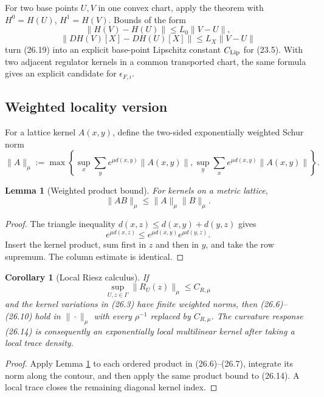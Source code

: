 \documentclass[11pt]{article}
\newtheorem{lemma}[theorem]{Lemma}
\newtheorem{corollary}[theorem]{Corollary}
\begin{document}
For two base points \(U,V\) in one convex chart, apply the theorem with
\(H^0=H(U)\), \(H^1=H(V)\).  Bounds of the form
\[
 \|H(V)-H(U)\|\leq L_0\|V-U\|,
 \tag{26.24}
\]
\[
 \|D H(V)[X]-D H(U)[X]\|
 \leq L_X\|V-U\|
 \tag{26.25}
\]
turn (26.19) into an explicit base-point Lipschitz constant
\(C_{\rm Lip}\) for (23.5).  With two adjacent regulator kernels in a
common transported chart, the same formula gives an explicit candidate
for \(\epsilon_{F,i}\).

\subsection{Weighted locality version}

For a lattice kernel \(A(x,y)\), define the two-sided exponentially
weighted Schur norm
\[
 \|A\|_\mu
 :=
 \max\left\{
 \sup_x\sum_y e^{\mu d(x,y)}\|A(x,y)\|,
 \sup_y\sum_x e^{\mu d(x,y)}\|A(x,y)\|
 \right\}.
 \tag{26.26}
\]

\begin{lemma}[Weighted product bound]
\label{lem:v11v26-weighted-product}
For kernels on a metric lattice,
\[
 \|AB\|_\mu\leq\|A\|_\mu\|B\|_\mu.
 \tag{26.27}
\]
\end{lemma}

\begin{proof}
The triangle inequality
\(d(x,z)\leq d(x,y)+d(y,z)\) gives
\[
 e^{\mu d(x,z)}
 \leq e^{\mu d(x,y)}e^{\mu d(y,z)}.
\]
Insert the kernel product, sum first in \(z\) and then in \(y\), and
take the row supremum.  The column estimate is identical.
\end{proof}

\begin{corollary}[Local Riesz calculus]
\label{cor:v11v26-local-riesz}
If
\[
 \sup_{U,z\in\Gamma}\|R_U(z)\|_\mu\leq C_{R,\mu}
 \tag{26.28}
\]
and the kernel variations in (26.3) have finite weighted norms, then
(26.6)--(26.10) hold in \(\|\cdot\|_\mu\) with every
\(\rho^{-1}\) replaced by \(C_{R,\mu}\).  The curvature response
(26.14) is consequently an exponentially local multilinear kernel
after taking a local trace density.
\end{corollary}

\begin{proof}
Apply Lemma \ref{lem:v11v26-weighted-product} to each ordered product in
(26.6)--(26.7), integrate its norm along the contour, and then apply the
same product bound to (26.14).  A local trace closes the remaining
diagonal kernel index.
\end{proof}
\end{document}
